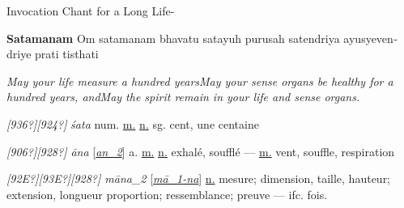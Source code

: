 \documentclass[12pt,twoside]{article}
\begin{document}
{
Invocation Chant for a Long Life{}-}

{\centering
\foreignlanguage{english}{\textbf{Satamanam}}\foreignlanguage{english}{\newline
\newline
Om satamanam bhavatu satayuh\newline
purusah satendriya\newline
ayusyevendriye prati tisthati}
\par}

{
 \textit{May your life measure a hundred
years\newline May your sense organs be healthy for a hundred years,
and\newline May the spirit remain in your life and sense organs.}}


\bigskip

\textit{[936?][924?] }\textit{\'sata} num.
\href{http://sanskrit.inria.fr/cgi-bin/sktdeclin?q="sata;g=Mas;r=}{m.}
\href{http://sanskrit.inria.fr/cgi-bin/sktdeclin?q="sata;g=Neu;r=}{n.}
sg. cent, une centaine


\bigskip

\textit{[906?][928?] \=ana}
[\href{http://sanskrit.inria.fr/DICO/2.html#anf2}{\textit{an\_2}}] a.
\href{http://sanskrit.inria.fr/cgi-bin/sktdeclin?q=aana;g=Mas;r=}{m.}
\href{http://sanskrit.inria.fr/cgi-bin/sktdeclin?q=aana;g=Neu;r=}{n.}
exhal\'e, souffl\'e {---}
\href{http://sanskrit.inria.fr/cgi-bin/sktdeclin?q=aana;g=Mas;r=}{m.}
vent, souffle, respiration


\bigskip

\textit{[92E?][93E?][928?] m\=ana\_2}
[\href{http://sanskrit.inria.fr/DICO/50.html#maaf1}{\textit{m\=a\_1}}\href{http://sanskrit.inria.fr/DICO/34.html#-na}{\textit{{}-na}}]
\href{http://sanskrit.inria.fr/cgi-bin/sktdeclin?q=maana#2;g=Neu;r=}{n.}
mesure; dimension, taille, hauteur; extension, longueur {\textbar}
proportion; ressemblance; preuve {---} ifc. fois.


\bigskip
\end{document}
